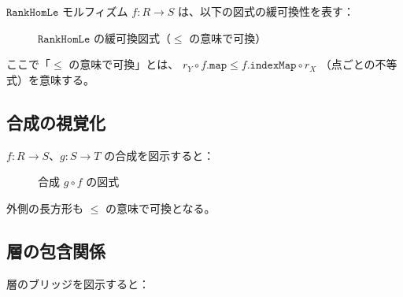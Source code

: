 \documentclass[11pt,a4paper,ja=standard]{bxjsarticle}
\theoremstyle{definition}
\newcommand{\RankHomLe}{\mathtt{RankHomLe}}
\begin{document}
$\RankHomLe$ モルフィズム $f : R \to S$ は、以下の図式の緩可換性を表す：

\begin{figure}[h]
\centering
{}
\caption{$\RankHomLe$ の緩可換図式（$\le$ の意味で可換）}
\label{fig:rankhomle-diagram}
\end{figure}

ここで「$\le$ の意味で可換」とは、
$r_Y \circ f.\mathtt{map} \le f.\mathtt{indexMap} \circ r_X$
（点ごとの不等式）を意味する。

\subsection{合成の視覚化}

$f : R \to S$、$g : S \to T$ の合成を図示すると：

\begin{figure}[h]
\centering
{}
\caption{合成 $g \circ f$ の図式}
\label{fig:composition}
\end{figure}

外側の長方形も $\le$ の意味で可換となる。

\subsection{層の包含関係}

層のブリッジを図示すると：
\end{document}
